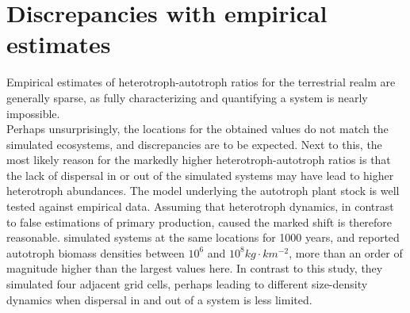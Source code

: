\section{Discrepancies with empirical estimates}
Empirical estimates of heterotroph-autotroph ratios for the terrestrial realm are generally sparse, as fully characterizing and quantifying a system is nearly impossible.\\ 
Perhaps unsurprisingly, the locations for the obtained values do not match the simulated ecosystems, and discrepancies are to be expected. Next to this, the most likely reason for the markedly higher heterotroph-autotroph ratios is that the lack of dispersal in or out of the simulated systems may have lead to higher heterotroph abundances. The model \citep{Smith2012} underlying the autotroph plant stock is well tested against empirical data. Assuming that heterotroph dynamics, in contrast to false estimations of primary production, caused the marked shift is therefore reasonable. \cite{Harfoot2014} simulated systems at the same locations for 1000 years, and reported autotroph biomass densities between $10^{6}$ and $10^{8} kg\cdot km^{-2}$, more than an order of magnitude higher than the largest values here. 
In contrast to this study, they simulated four adjacent grid cells, perhaps leading to different size-density dynamics when dispersal in and out of a system is less limited.
